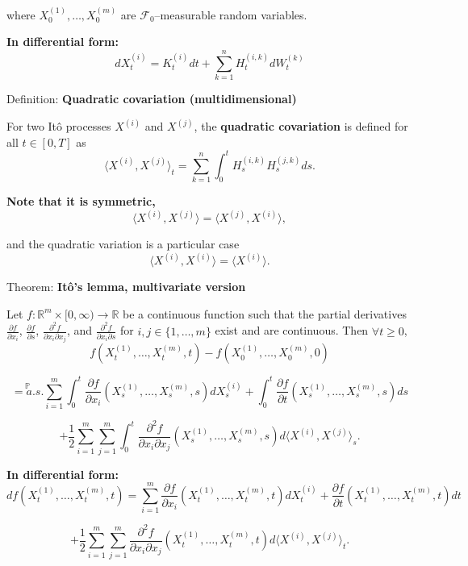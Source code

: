 \documentclass[12pt,a4paper]{article}
\begin{document}
where $X_0^{(1)}, \ldots, X_0^{(m)}$ are $\mathcal{F}_0$--measurable random variables.

\textbf{In differential form:}
\[
dX_t^{(i)} = K_t^{(i)} dt + \sum_{k=1}^{n} H_t^{(i,k)} dW_t^{(k)}
\]

\vspace{1em}

Definition: \textbf{Quadratic covariation (multidimensional)}
\vspace{0.5em}

For two Itô processes $X^{(i)}$ and $X^{(j)}$, the \textbf{quadratic covariation} is defined for all $t \in [0, T]$ as
\[
\langle X^{(i)}, X^{(j)} \rangle_t = \sum_{k=1}^{n} \int_0^t H_s^{(i,k)} H_s^{(j,k)} ds.
\]

\textbf{Note that it is symmetric,}
\[
\langle X^{(i)}, X^{(j)} \rangle = \langle X^{(j)}, X^{(i)} \rangle,
\]

and the quadratic variation is a particular case
\[
\langle X^{(i)}, X^{(i)} \rangle = \langle X^{(i)} \rangle.
\]

\vspace{1em}

Theorem: \textbf{Itô's lemma, multivariate version}
\vspace{0.5em}

Let $f : \mathbb{R}^m \times [0, \infty) \to \mathbb{R}$ be a continuous function such that the partial derivatives $\frac{\partial f}{\partial x_i}$, $\frac{\partial f}{\partial s}$, $\frac{\partial^2 f}{\partial x_i \partial x_j}$, and $\frac{\partial^2 f}{\partial x_i \partial s}$ for $i,j \in \{1, \ldots, m\}$ exist and are continuous. Then $\forall t \geq 0$,
\[
f(X_t^{(1)}, \ldots, X_t^{(m)}, t) - f(X_0^{(1)}, \ldots, X_0^{(m)}, 0)
\]

\[
\stackrel{\mathbb{P}}{=a.s.} \sum_{i=1}^{m} \int_0^t \frac{\partial f}{\partial x_i}(X_s^{(1)}, \ldots, X_s^{(m)}, s) dX_s^{(i)} + \int_0^t \frac{\partial f}{\partial t}(X_s^{(1)}, \ldots, X_s^{(m)}, s) ds
\]

\[
+ \frac{1}{2} \sum_{i=1}^{m} \sum_{j=1}^{m} \int_0^t \frac{\partial^2 f}{\partial x_i \partial x_j}(X_s^{(1)}, \ldots, X_s^{(m)}, s) d\langle X^{(i)}, X^{(j)} \rangle_s.
\]

\textbf{In differential form:}
\[
df(X_t^{(1)}, \ldots, X_t^{(m)}, t) = \sum_{i=1}^{m} \frac{\partial f}{\partial x_i}(X_t^{(1)}, \ldots, X_t^{(m)}, t) dX_t^{(i)} + \frac{\partial f}{\partial t}(X_t^{(1)}, \ldots, X_t^{(m)}, t) dt
\]

\[
+ \frac{1}{2} \sum_{i=1}^{m} \sum_{j=1}^{m} \frac{\partial^2 f}{\partial x_i \partial x_j}(X_t^{(1)}, \ldots, X_t^{(m)}, t) d\langle X^{(i)}, X^{(j)} \rangle_t.
\]
\end{document}

